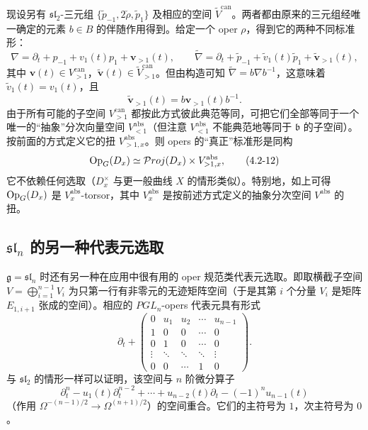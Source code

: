 现设另有 $\mathfrak{sl}_2$-三元组 $\{\widetilde{p}_{-1},2\check{\rho},\widetilde{p}_1\}$ 及相应的空间 $\widetilde{V}^{\mathrm{can}}$。两者都由原来的三元组经唯一确定的元素 $b\in B$ 的伴随作用得到。给定一个 oper $\rho$，得到它的两种不同标准形：
\[
    \nabla=\partial_t+p_{-1}+v_1(t)p_1+\mathbf{v}_{>1}(t),\qquad
    \widetilde{\nabla}=\partial_t+\widetilde{p}_{-1}+\widetilde{v}_1(t)\widetilde{p}_1+\widetilde{\mathbf{v}}_{>1}(t),
\]
其中 $\mathbf{v}(t)\in V_{>1}^{\mathrm{can}}$，$\widetilde{\mathbf{v}}(t)\in\widetilde{V}_{>1}^{\mathrm{can}}$。但由构造可知 $\widetilde{\nabla}=b\nabla b^{-1}$，这意味着 $\widetilde{v}_1(t)=v_1(t)$，且
\[
    \widetilde{\mathbf{v}}_{>1}(t)=b\mathbf{v}_{>1}(t)b^{-1}.
\]
由于所有可能的子空间 $V_{>1}^{\mathrm{can}}$ 都按此方式彼此典范等同，可把它们全部等同于一个唯一的“抽象”分次向量空间 $V_{<1}^{\mathrm{abs}}$（但注意 $V_{<1}^{\mathrm{abs}}$ 不能典范地等同于 $\mathfrak{b}$ 的子空间）。按前面的方式定义它的扭 $V_{>1,x}^{\mathrm{abs}}$。则 opers 的“真正”标准形是同构
\begin{equation}
    \operatorname{Op}_G(D_x)\simeq\mathcal{P}roj(D_x)\times V_{>1,x}^{\mathrm{abs}},
    \tag{4.2-12}
\end{equation}
它不依赖任何选取（$D_x^\times$ 与更一般曲线 $X$ 的情形类似）。特别地，如上可得 $\operatorname{Op}_G(D_x)$ 是 $V_x^{\mathrm{abs}}$-torsor，其中 $V_x^{\mathrm{abs}}$ 是按前述方式定义的抽象分次空间 $V^{\mathrm{abs}}$ 的扭。


\subsection{$\mathfrak{sl}_n$ 的另一种代表元选取}

$\mathfrak{g}=\mathfrak{sl}_n$ 时还有另一种在应用中很有用的 oper 规范类代表元选取。即取横截子空间 $V=\bigoplus_{i=1}^{n-1}V_i$ 为只第一行有非零元的无迹矩阵空间（于是其第 $i$ 个分量 $V_i$ 是矩阵 $E_{1,i+1}$ 张成的空间）。相应的 $PGL_n$-opers 代表元具有形式
\begin{equation}
    \partial_t+\begin{pmatrix}
        0&u_1&u_2&\cdots&u_{n-1}\\
        1&0&0&\cdots&0\\
        0&1&0&\cdots&0\\
        \vdots&\ddots&\ddots&\ddots&\vdots\\
        0&0&\cdots&1&0
    \end{pmatrix}.
    \tag{4.2-13}
\end{equation}
与 $\mathfrak{sl}_2$ 的情形一样可以证明，该空间与 $n$ 阶微分算子
\begin{equation}
    \partial_t^n-u_1(t)\partial_t^{n-2}+\cdots+u_{n-2}(t)\partial_t-(-1)^nu_{n-1}(t)
    \tag{4.2-14}
\end{equation}
（作用 $\Omega^{-(n-1)/2}\to\Omega^{(n+1)/2}$）的空间重合。它们的主符号为 $1$，次主符号为 $0$。

